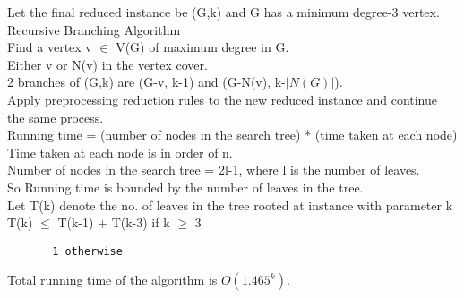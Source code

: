 Let the final reduced instance be (G,k) and G has a minimum degree-3 vertex. \\
Recursive Branching Algorithm \\
Find a vertex v $\in$ V(G) of maximum degree in G. \\
Either v or N(v) in the vertex cover. \\
2 branches of (G,k) are (G-v, k-1) and (G-N(v), k-$|N(G)|$). \\
Apply preprocessing reduction rules to the new reduced instance and continue the same process. \\

Running time = (number of nodes in the search tree) * (time taken at each node) \\
Time taken at each node is in order of n. \\
Number of nodes in the search tree = 2l-1, where l is the number of leaves. \\

So Running time is bounded by the number of leaves in the tree. \\
Let T(k) denote the no. of leaves in the tree rooted at instance with parameter k \\
T(k) $\leq$ T(k-1) + T(k-3) if k $\geq$ 3 \\
\vspace{-1.4cm}
\begin{verbatim}  
       1 otherwise
\end{verbatim}
\vspace{-0.5cm}
Total running time of the algorithm is $O(1.465^k)$.
